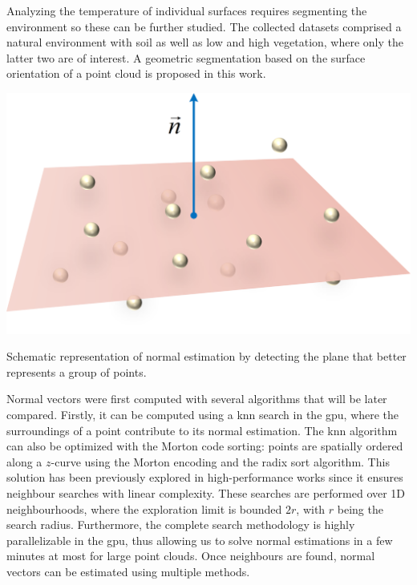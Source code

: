 Analyzing the temperature of individual surfaces requires segmenting the environment so these can be further studied. The collected datasets comprised a natural environment with soil as well as low and high vegetation, where only the latter two are of interest. A geometric segmentation based on the surface orientation of a point cloud is proposed in this work.

\begin{marginfigure}[1cm]
	\includegraphics{figs/thermal_projection/plane_fitting.png}
	\caption{Schematic representation of normal estimation by detecting the plane that better represents a group of points.}
	\label{fig:plane_fitting}
\end{marginfigure}
Normal vectors were first computed with several algorithms that will be later compared. Firstly, it can be computed using a \acrshort{knn} search in the \acrshort{gpu}, where the surroundings of a point contribute to its normal estimation. The \acrshort{knn} algorithm can also be optimized with the Morton code sorting: points are spatially ordered along a $\textit{z}$-curve using the Morton encoding and the radix sort algorithm. This solution has been previously explored in high-performance works \cite{jakob_optimizing_2021} since it ensures neighbour searches with linear complexity. These searches are performed over 1D neighbourhoods, where the exploration limit is bounded $2r$, with $r$ being the search radius. Furthermore, the complete search methodology is highly parallelizable in the \acrshort{gpu}, thus allowing us to solve normal estimations in a few minutes at most for large point clouds. Once neighbours are found, normal vectors can be estimated using multiple methods.
